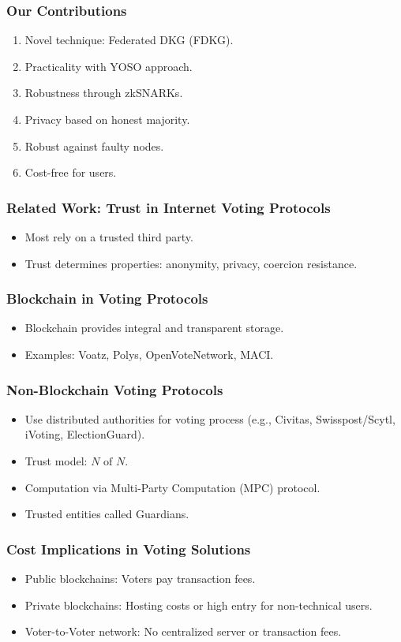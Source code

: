 \documentclass{beamer}
\begin{document}
\begin{frame}
	\frametitle{Our Contributions}
	\begin{enumerate}
		\item Novel technique: Federated DKG (FDKG).
		\item Practicality with YOSO approach.
		\item Robustness through zkSNARKs.
		\item Privacy based on honest majority.
		\item Robust against faulty nodes.
		\item Cost-free for users.
	\end{enumerate}
\end{frame}

\begin{frame}
	\frametitle{Related Work: Trust in Internet Voting Protocols}
	\begin{itemize}
		\item Most rely on a trusted third party.
		\item Trust determines properties: anonymity, privacy, coercion resistance.
	\end{itemize}
\end{frame}

\begin{frame}
	\frametitle{Blockchain in Voting Protocols}
	\begin{itemize}
		\item Blockchain provides integral and transparent storage.
		\item Examples: Voatz, Polys, OpenVoteNetwork, MACI.
	\end{itemize}
\end{frame}


\begin{frame}
	\frametitle{Non-Blockchain Voting Protocols}
	\begin{itemize}
		\item Use distributed authorities for voting process (e.g., Civitas, Swisspost/Scytl, iVoting, ElectionGuard).
		\item Trust model: $N \textrm{ of } N$.
		\item Computation via Multi-Party Computation (MPC) protocol.
		\item Trusted entities called Guardians.
	\end{itemize}
\end{frame}

\begin{frame}
	\frametitle{Cost Implications in Voting Solutions}
	\begin{itemize}
		\item Public blockchains: Voters pay transaction fees.
		\item Private blockchains: Hosting costs or high entry for non-technical users.
		\item Voter-to-Voter network: No centralized server or transaction fees.
	\end{itemize}
\end{frame}
\end{document}
